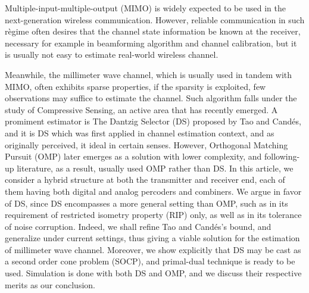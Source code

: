 
\starttitle [title={Abstract}]

Multiple-input-multiple-output (MIMO) is widely expected to be used in the next-generation wireless communication.
However, reliable communication in such r\`egime often desires that the channel state information be known at the receiver, necessary for example in beamforming algorithm and channel calibration, but it is usually not easy to estimate real-world wireless channel.

Meanwhile, the millimeter wave channel, which is usually used in tandem with MIMO, often exhibits sparse properties, if the sparsity is exploited, few observations may suffice to estimate the channel.
Such algorithm falls under the study of Compressive Sensing, an active area that has recently emerged.
A promiment estimator is The Dantzig Selector (DS) proposed by Tao and Cand\'es, and it is DS which was first applied in channel estimation context, and as originally perceived, it ideal in certain senses.
However, Orthogonal Matching Pursuit (OMP) later emerges as a solution with lower complexity, and following-up literature, as a result, usually used OMP rather than DS.
In this article, we consider a hybrid structure at both the transmitter and receiver end, each of them having both digital and analog percoders and combiners.
We argue in favor of DS, since DS encompasses a more general setting than OMP, such as in its requirement of restricted isometry property (RIP) only, as well as in its tolerance of noise corruption.
Indeed, we shall refine Tao and Cand\'es's bound, and generalize under current settings, thus giving a viable solution for the estimation of millimeter wave channel.
Moreover, we show explicitly that DS may be cast as a second order cone problem (SOCP), and primal-dual technique is ready to be used.
Simulation is done with both DS and OMP, and we discuss their respective merits as our conclusion.


\stoptitle

